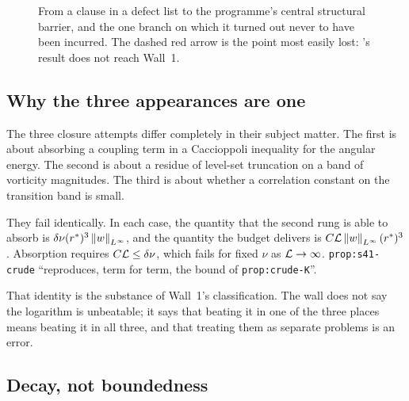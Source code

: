 \begin{figure}[ht]
\caption[The life of the logarithm]{From a clause in a defect list to the
programme's central structural barrier, and the one branch on which it turned
out never to have been incurred. The dashed red arrow is the point most easily
lost: 's result does not reach Wall~1.}
\label{fig:cz-genealogy}
\end{figure}

\subsection{Why the three appearances are one}

The three closure attempts differ completely in their subject matter. The
first is about absorbing a coupling term in a Caccioppoli inequality for the
angular energy. The second is about a residue of level-set truncation on a
band of vorticity magnitudes. The third is about whether a correlation
constant on the transition band is small.

They fail identically. In each case, the quantity that the second rung is able
to absorb is \(\delta\nu(r^{*})^3\left\|w\right\|_{L^\infty}\), and the quantity the
budget delivers is \(C\mathcal{L}\left\|w\right\|_{L^\infty}(r^{*})^3\). Absorption
requires \(C\mathcal{L}\le\delta\nu\), which fails for fixed \(\nu\) as
\(\mathcal{L}\to\infty\). \texttt{prop:s41-crude} ``reproduces, term for term, the
bound of \texttt{prop:crude-K}''.

That identity is the substance of Wall~1's classification. The wall does not
say the logarithm is unbeatable; it says that beating it in one of the three
places means beating it in all three, and that treating them as separate
problems is an error.

\subsection{Decay, not boundedness}

